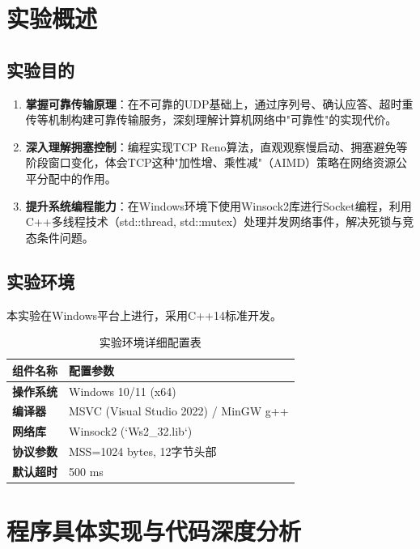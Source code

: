 \documentclass[UTF8,a4paper,10pt]{ctexart}
\begin{document}
\section{实验概述}

\subsection{实验目的}
\begin{enumerate}
    \item \textbf{掌握可靠传输原理}：在不可靠的UDP基础上，通过序列号、确认应答、超时重传等机制构建可靠传输服务，深刻理解计算机网络中"可靠性"的实现代价。
    \item \textbf{深入理解拥塞控制}：编程实现TCP Reno算法，直观观察慢启动、拥塞避免等阶段窗口变化，体会TCP这种"加性增、乘性减"（AIMD）策略在网络资源公平分配中的作用。
    \item \textbf{提升系统编程能力}：在Windows环境下使用Winsock2库进行Socket编程，利用C++多线程技术（std::thread, std::mutex）处理并发网络事件，解决死锁与竞态条件问题。
\end{enumerate}

\subsection{实验环境}
本实验在Windows平台上进行，采用C++14标准开发。
\begin{table}[H]
    \centering
    \caption{实验环境详细配置表}
    \label{tab:env_config}
    \renewcommand{\arraystretch}{1.3}
    \begin{tabular}{l|l}
        \toprule
        \textbf{组件名称} & \textbf{配置参数}                         \\
        \midrule
        \textbf{操作系统} & Windows 10/11 (x64)                   \\
        \textbf{编译器}  & MSVC (Visual Studio 2022) / MinGW g++ \\
        \textbf{网络库}  & Winsock2 (`Ws2\_32.lib`)              \\
        \textbf{协议参数} & MSS=1024 bytes, 12字节头部                \\
        \textbf{默认超时} & 500 ms                                \\
        \bottomrule
    \end{tabular}
\end{table}

\section{程序具体实现与代码深度分析}
\end{document}
